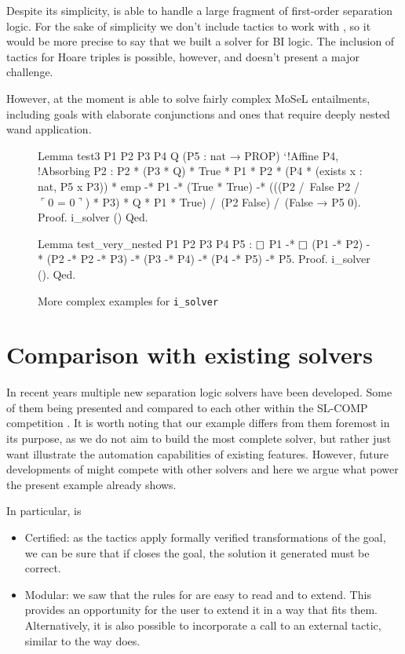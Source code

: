 Despite its simplicity,  is able to handle a large fragment of first-order separation logic.
For the sake of simplicity we don't include tactics to work with , so it would be more precise to say that we built a solver for BI logic.
The inclusion of tactics for Hoare triples is possible, however, and doesn't present a major challenge.

However, at the moment  is able to solve fairly complex MoSeL entailments, including goals with elaborate conjunctions and ones that require deeply nested wand application.

\begin{figure}[H]
\begin{coq}
Lemma test3 P1 P2 P3 P4 Q (P5 : nat → PROP) `{!Affine P4, !Absorbing P2} :
  P2 * (P3 * Q) * True * P1 * P2 * (P4 * (exists x : nat, P5 x \/ P3)) * emp -*
    P1 -* (True * True) -*
  (((P2 /\ False \/ P2 /\ $\ulcorner$0 = 0$\urcorner$) * P3) * Q * P1 * True) /\
    (P2 \/ False) /\ (False → P5 0).
Proof. i_solver () Qed.
\end{coq}
\begin{coq}
Lemma test_very_nested P1 P2 P3 P4 P5 :
  $\mathop{\Box}$ P1 -* $\mathop{\Box}$ (P1 -* P2) -* (P2 -* P2 -* P3) -*
  (P3 -* P4) -* (P4 -* P5) -* P5.
Proof. i_solver (). Qed.
\end{coq}
\caption{More complex examples for \texttt{i\_solver}}
\label{fig:bigger-example-i-solver}
\end{figure}

\section{Comparison with existing solvers}

In recent years multiple new separation logic solvers have been developed.
Some of them being presented and compared to each other within the SL-COMP competition \cite{sighireanuSLCOMPCompetitionSolvers2019}.
It is worth noting that our example differs from them foremost in its purpose, as we do not aim to build the most complete solver, but rather just want illustrate the automation capabilities of existing features.
However, future developments of \coqe{i_solver} might compete with other solvers and here we argue what power the present example already shows.

In particular,  is
\begin{itemize}
\item Certified:
  as the tactics apply formally verified transformations of the goal, we can be sure that if  closes the goal, the solution it generated must be correct.
\item Modular:
  we saw that the rules for  are easy to read and to extend.
  This provides an opportunity for the user to extend it in a way that fits them.
  Alternatively, it is also possible to incorporate a call to an external tactic, similar to the way  does.
\end{itemize}

